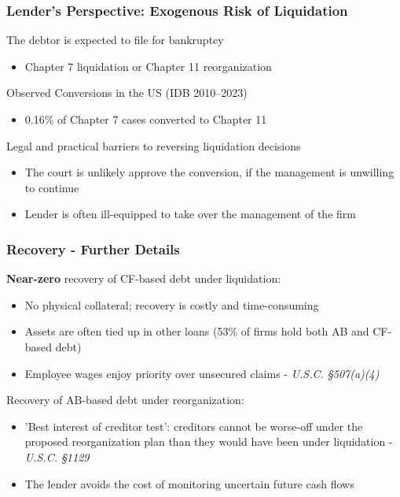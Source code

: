 \documentclass[aspectratio=169,xcolor=table]{beamer}
\begin{document}
\begin{frame}[label = Conversions] \frametitle{Lender's Perspective: Exogenous Risk of Liquidation \hfill  \hyperlink{motivation2}{}}

The debtor is expected to file for bankruptcy
\begin{itemize} \small 
    \item Chapter 7 liquidation or Chapter 11 reorganization
\end{itemize} \normalsize \vspace{6mm} 

Observed Conversions in the US (IDB 2010–2023)
\begin{itemize} \small 
    \item 0.16\% of Chapter 7 cases converted to Chapter 11
\end{itemize} \normalsize  \vspace{6mm}

Legal and practical barriers to reversing liquidation decisions
\begin{itemize} \small
    \item The court is unlikely approve the conversion, if the management is unwilling to continue 
    \item Lender is often ill-equipped to take over the management of the firm
\end{itemize} \normalsize


\end{frame}



\begin{frame}[label = payoffs_det] \frametitle{Recovery - Further Details \hfill  \hyperlink{payoffs}{}}

\textbf{Near-zero} recovery of CF-based debt under liquidation: 
\begin{itemize} \small
    \item No physical collateral; recovery is costly and time-consuming
    \item Assets are often tied up in other loans (53\% of firms hold both AB and CF-based debt)
    \item Employee wages enjoy priority over unsecured claims - \textit{U.S.C. §507(a)(4)}
\end{itemize} \normalsize \vspace{5mm}

Recovery of AB-based debt under reorganization: 
\begin{itemize} \small
    \item 'Best interest of creditor test': creditors cannot be worse-off under the proposed reorganization plan than they would have been under liquidation - \textit{U.S.C. §1129}
    \item The lender avoids the cost of monitoring uncertain future cash flows
\end{itemize} \normalsize
 \normalsize 


\end{frame}
\end{document}
